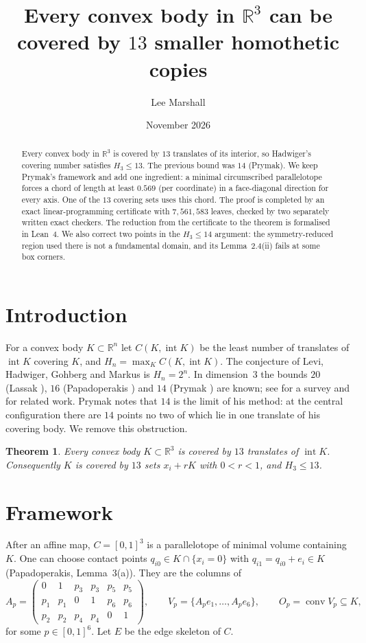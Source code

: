 \documentclass[11pt]{article}
\title{Every convex body in $\mathbb{R}^3$ can be covered by $13$ smaller homothetic copies}
\author{Lee Marshall}
\date{November 2026}
\newtheorem{theorem}{Theorem}
\newcommand{\R}{\mathbb{R}}
\newcommand{\inter}{\operatorname{int}}
\newcommand{\conv}{\operatorname{conv}}
\begin{document}
\maketitle

\begin{abstract}
Every convex body in $\R^3$ is covered by $13$ translates of its interior, so Hadwiger's covering number
satisfies $H_3\le 13$. The previous bound was $14$ (Prymak). We keep Prymak's framework and add one ingredient:
a minimal circumscribed parallelotope forces a chord of length at least $0.569$ (per coordinate) in a
face-diagonal direction for every axis. One of the $13$ covering sets uses this chord. The proof is completed by
an exact linear-programming certificate with $7{,}561{,}583$ leaves, checked by two separately written exact
checkers. The reduction from the certificate to the theorem is formalised in Lean~4. We also correct two points
in the $H_3\le 14$ argument: the symmetry-reduced region used there is not a fundamental domain, and its
Lemma~2.4(ii) fails at some box corners.
\end{abstract}

\section{Introduction}
For a convex body $K\subset\R^n$ let $C(K,\inter K)$ be the least number of translates of $\inter K$ covering $K$,
and $H_n=\max_K C(K,\inter K)$. The conjecture of Levi, Hadwiger, Gohberg and Markus is $H_n=2^n$. In
dimension~$3$ the bounds $20$ (Lassak \cite{Las}), $16$ (Papadoperakis \cite{Pap}) and $14$ (Prymak \cite{Pry}) are known; see \cite{BK} for a survey and \cite{PS,ABP} for related work.
Prymak notes that $14$ is the limit of his method: at the central configuration there are $14$ points no two of
which lie in one translate of his covering body. We remove this obstruction.

\begin{theorem}\label{thm:main}
Every convex body $K\subset\R^3$ is covered by $13$ translates of $\inter K$. Consequently $K$ is covered by $13$
sets $x_i+rK$ with $0<r<1$, and $H_3\le 13$.
\end{theorem}

\section{Framework}
After an affine map, $C=[0,1]^3$ is a parallelotope of minimal volume containing $K$. One can choose contact
points $q_{i0}\in K\cap\{x_i=0\}$ with $q_{i1}=q_{i0}+e_i\in K$ (Papadoperakis, Lemma~3(a)). They are the columns
of
\[
A_p=\begin{pmatrix}0&1&p_3&p_3&p_5&p_5\\ p_1&p_1&0&1&p_6&p_6\\ p_2&p_2&p_4&p_4&0&1\end{pmatrix},
\qquad V_p=\{A_pe_1,\dots,A_pe_6\},\qquad O_p=\conv V_p\subseteq K,
\]
for some $p\in[0,1]^6$. Let $E$ be the edge skeleton of $C$.
\end{document}

